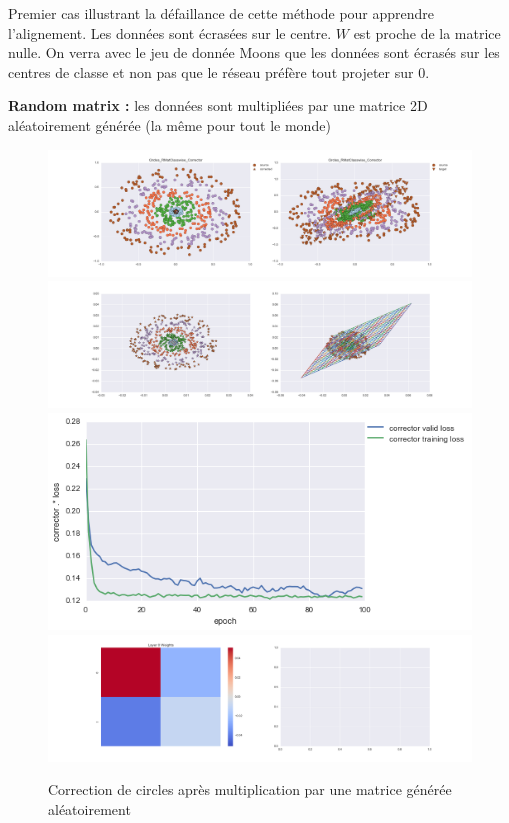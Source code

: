 Premier cas illustrant la défaillance de cette méthode pour apprendre l'alignement. 
Les données sont écrasées sur le centre. $W$ est proche de la matrice nulle.
On verra avec le jeu de donnée Moons que les données sont écrasés sur les centres de classe
et non pas que le réseau préfère tout projeter sur 0.


{\Large \textbf{Random matrix :}} les données sont multipliées par une matrice 2D aléatoirement générée
 (la même pour tout le monde)

\begin{figure}[H] %
\centering
\includegraphics[width=\linewidth]{fig/24-05-2016/circles/Circles_RMatClasswise_Corrector-DATA.png}
\includegraphics[width=\linewidth]{fig/24-05-2016/circles/Circles_RMatClasswise_Corrector-GridCheck.png}
\includegraphics[width=0.45\linewidth]{fig/24-05-2016/circles/Circles_RMatClasswise_Corrector-Learning_curve.png}
\includegraphics[width=\linewidth]{fig/24-05-2016/circles/Circles_RMatClasswise_Corrector-W.png}
\caption{Correction de circles après multiplication par une matrice générée aléatoirement}
\label{fig:recap-circles-RMat-classwise}
\end{figure}


